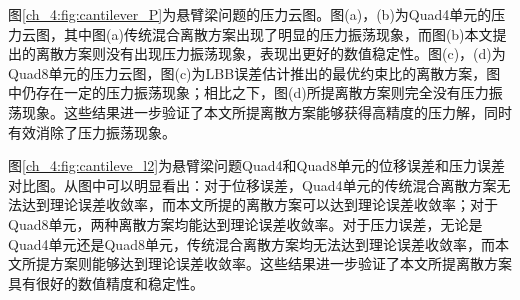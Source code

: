 图\ref{ch_4:fig:cantilever_P}为悬臂梁问题的压力云图。图(a)，(b)为Quad4单元的压力云图，其中图(a)传统混合离散方案出现了明显的压力振荡现象，而图(b)本文提出的离散方案则没有出现压力振荡现象，表现出更好的数值稳定性。图(c)，(d)为Quad8单元的压力云图，图(c)为LBB误差估计推出的最优约束比的离散方案，图中仍存在一定的压力振荡现象；相比之下，图(d)所提离散方案则完全没有压力振荡现象。这些结果进一步验证了本文所提离散方案能够获得高精度的压力解，同时有效消除了压力振荡现象。

图\ref{ch_4:fig:cantileve_l2}为悬臂梁问题Quad4和Quad8单元的位移误差和压力误差对比图。从图中可以明显看出：对于位移误差，Quad4单元的传统混合离散方案无法达到理论误差收敛率，而本文所提的离散方案可以达到理论误差收敛率；对于Quad8单元，两种离散方案均能达到理论误差收敛率。对于压力误差，无论是Quad4单元还是Quad8单元，传统混合离散方案均无法达到理论误差收敛率，而本文所提方案则能够达到理论误差收敛率。这些结果进一步验证了本文所提离散方案具有很好的数值精度和稳定性。
